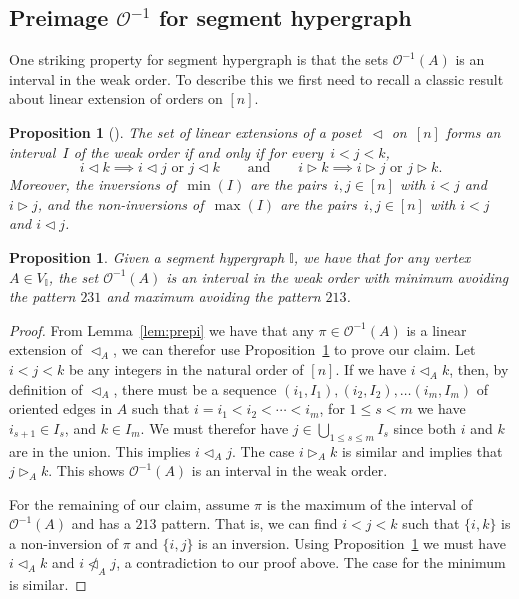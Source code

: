 \documentclass[reqno]{amsart}
\newtheorem{proposition}[theorem]{Proposition}
\theoremstyle{definition}
\newcommand{\less}{\vartriangleleft} %
\newcommand{\more}{\vartriangleright} %
\newcommand{\Or}{\mathcal O}  %
\newcommand{\II}{\mathbb I} %
\begin{document}
\subsection{Preimage $\Or^{-1}$ for segment hypergraph} 
\label{subsec:preimageI}
One striking property for segment hypergraph is that  the sets  $\Or^{-1}(A)$ is an interval in the weak order.
To describe this we first need to recall a classic result about linear extension of orders on $[n]$.

\begin{proposition}[{\cite[Thm.~6.8]{BjornerWachs}}]
\label{prop:WOIP}
The set of linear extensions of a poset~$\less$ on~$[n]$ forms an interval~$I$ of the weak order if and only if for every~$i < j < k$,
\[
i \less k \implies i \less j \text{ or } j \less k
\qquad\text{and}\qquad
i \more k \implies i \more j \text{ or } j \more k.
\]
Moreover, the inversions of~$\min(I)$ are the pairs~$i,j \in [n]$ with $i < j$ and $i \more j$, and the non-inversions of~$\max(I)$ are the pairs~$i,j \in [n]$ with $i < j$ and $i \less j$.
\end{proposition}


\begin{proposition}\label{prop:preimage}
 Given a segment hypergraph $\II$, we have that for any vertex $A\in V_{\II}$, the set $\Or^{-1}(A)$ is an interval 
 in the weak order with minimum avoiding the pattern $231$ and maximum avoiding the pattern $213$.
\end{proposition}

\begin{proof}
From Lemma~\ref{lem:prepi} we have that any $\pi\in \Or^{-1}(A)$  is a linear extension of $\less_A$, we can therefor use Proposition~\ref{prop:WOIP} to prove our claim. 
Let $i<j<k$ be any integers in the natural order of $[n]$. If we have $i\less_{A} k$, then, by definition of $\less_A$, there must be a sequence $(i_1,I_{1}), (i_2,I_{2}),\ldots (i_m,I_{m})$ of oriented edges in $A$ such that
$i=i_1<i_2<\cdots <i_{m}$, for $1\le s<m$ we have $i_{s+1}\in I_s$, and $k\in I_m$. We must therefor have $j\in\bigcup_{1\le s\le m} I_s$ since both $i$ and $k$ are in the union. This implies $i\less_{A} j$. The case $i\more_{A} k$ is similar and  implies
that $j\more_A k$. This shows $\Or^{-1}(A)$ is an interval in the weak order.

For the remaining of our claim, assume $\pi$ is the maximum of the interval of $\Or^{-1}(A)$ and has a $213$ pattern. That is,  we can find $i<j<k$ such that $\{i,k\}$ is a non-inversion of $\pi$ and $\{i,j\}$ is an inversion. Using Proposition~\ref{prop:WOIP} we must have $i\less_A k$ and $i\not\less_A j$, a contradiction to our proof above. The case for the minimum is similar.
\end{proof}
\end{document}

